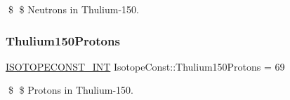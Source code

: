 \$ \$ Neutrons in Thulium-\/150. \mbox{\label{group___isotope_const-_thulium-_tm150_gade3a193cf297667c1b759db4a148c9f4}} 
\subsubsection{\texorpdfstring{Thulium150\+Protons}{Thulium150Protons}}
{\footnotesize\ttfamily \mbox{\hyperlink{group___isotope_const-_macros_ga5f18360b3e99483a35c32d789e62621c}{I\+S\+O\+T\+O\+P\+E\+C\+O\+N\+S\+T\+\_\+\+I\+NT}} Isotope\+Const\+::\+Thulium150\+Protons = 69}

\$ \$ Protons in Thulium-\/150. 